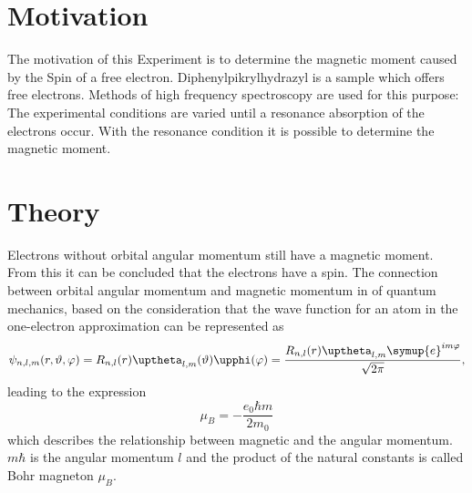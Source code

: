 \section{Motivation}
The motivation of this Experiment is to determine the magnetic moment caused by the Spin of a free electron.
Diphenylpikrylhydrazyl is a sample which offers free electrons. Methods of high frequency spectroscopy are used for this purpose:
The experimental conditions are varied until a resonance absorption of the electrons occur. With the resonance condition it is possible
to determine the magnetic moment.
\section{Theory}
Electrons without orbital angular momentum still have a magnetic moment.
From this it can be concluded that the electrons have a spin. The connection between orbital
angular momentum and magnetic momentum in
of quantum mechanics, based on the consideration that the
wave function for an atom in the one-electron approximation can be represented as
\begin{equation}
  \psi_{n,l,m}(r,\vartheta,\varphi)=R_{n,l}(r)\uptheta_{l,m}(\vartheta)\upphi(\varphi)=\frac{R_{n,l}(r)\uptheta_{l,m}\symup{e}^{im\varphi}}{\sqrt{2\pi}},
\end{equation}
leading to the expression
\begin{equation}
  \mu_B=-\frac{e_0\hbar m}{2m_0}
\end{equation}
which describes the relationship between magnetic
and the angular momentum. $m\hbar$ is the angular momentum $l$ and the product of the natural constants is called Bohr magneton $\mu_B$.
